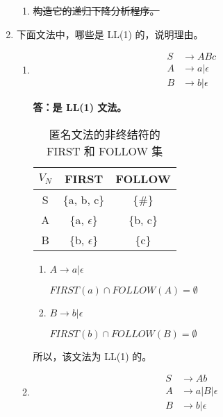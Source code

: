\begin{enumerate}
\begin{enumerate}
        \item \sout{构造它的递归下降分析程序。}
    \end{enumerate}
    
    \item 下面文法中，哪些是 LL(1) 的，说明理由。
    
    \begin{enumerate}
        \item \begin{align*}
            S & \to ABc \\
            A & \to a | \epsilon \\
            B & \to b | \epsilon
        \end{align*}
        
        \textbf{答：是 LL(1) 文法。}
        
        \begin{table}[H]
            \centering
            \begin{tabular}{|c|c|c|}
                \hline
                $V_N$ & FIRST & FOLLOW \\
                \hline
                S & \{a, b, c\} & \{\#\} \\
                \hline
                A & \{a, $\epsilon$\} & \{b, c\} \\
                \hline
                B & \{b, $\epsilon$\} & \{c\} \\
                \hline
            \end{tabular}
            \caption{匿名文法的非终结符的 FIRST 和 FOLLOW 集}
            \label{tab:FF3_1}
        \end{table}
        
        \begin{enumerate}
            \item $A \to a | \epsilon$
            
            $FIRST(a) \cap FOLLOW(A) = \emptyset$
            
            \item $B \to b | \epsilon$
            
            $FIRST(b) \cap FOLLOW(B) = \emptyset$
            
        \end{enumerate}
        
        所以，该文法为 LL(1) 的。
        
        \item \begin{align*}
            S & \to Ab \\
            A & \to a | B | \epsilon \\
            B & \to b | \epsilon
        \end{align*}
        

\end{enumerate}
\end{enumerate}
